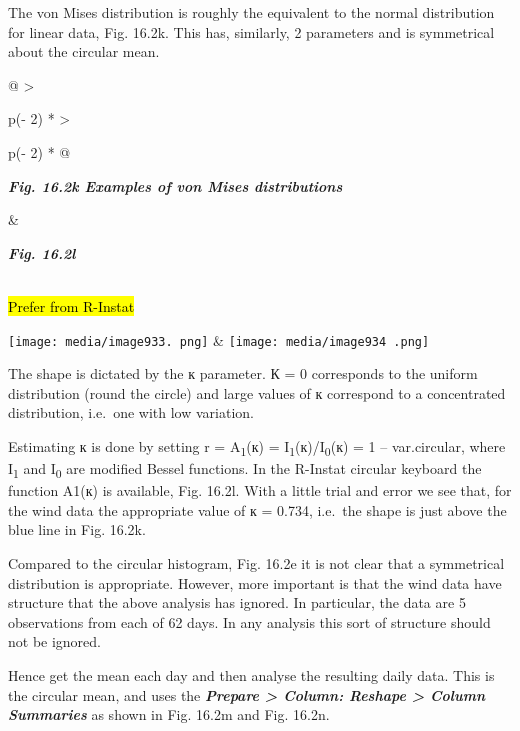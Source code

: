 \documentclass[
  letterpaper,
  DIV=11,
  numbers=noendperiod]{scrreprt}
\begin{document}
The von Mises distribution is roughly the equivalent to the normal
distribution for linear data, Fig. 16.2k. This has, similarly, 2
parameters and is symmetrical about the circular mean.

\begin{longtable}[]{@{}
  >{\raggedright\arraybackslash}p{(\columnwidth - 2\tabcolsep) * }
  >{\raggedright\arraybackslash}p{(\columnwidth - 2\tabcolsep) * }@{}}
\toprule\noalign{}
\begin{minipage}[b]{\linewidth}\raggedright
\textbf{\emph{Fig. 16.2k Examples of von Mises distributions}}
\end{minipage} & \begin{minipage}[b]{\linewidth}\raggedright
\textbf{\emph{Fig. 16.2l}}
\end{minipage} \\
\midrule\noalign{}
\endhead
\bottomrule\noalign{}
\endlastfoot
\hl{Prefer from R-Instat}

\texttt{[image: media/image933. png]}
&
\texttt{[image: media/image934 .png]} \\
\end{longtable}

The shape is dictated by the к parameter. К = 0 corresponds to the
uniform distribution (round the circle) and large values of к correspond
to a concentrated distribution, i.e.~one with low variation.

Estimating к is done by setting r = A\textsubscript{1}(к) =
I\textsubscript{1}(к)/I\textsubscript{0}(к) = 1 -- var.circular, where
I\textsubscript{1} and I\textsubscript{0} are modified Bessel functions.
In the R-Instat circular keyboard the function A1(к) is available, Fig.
16.2l. With a little trial and error we see that, for the wind data the
appropriate value of к = 0.734, i.e.~the shape is just above the blue
line in Fig. 16.2k.

Compared to the circular histogram, Fig. 16.2e it is not clear that a
symmetrical distribution is appropriate. However, more important is that
the wind data have structure that the above analysis has ignored. In
particular, the data are 5 observations from each of 62 days. In any
analysis this sort of structure should not be ignored.

Hence get the mean each day and then analyse the resulting daily data.
This is the circular mean, and uses the \textbf{\emph{Prepare
\textgreater{} Column: Reshape \textgreater{} Column Summaries}} as
shown in Fig. 16.2m and Fig. 16.2n.
\end{document}
